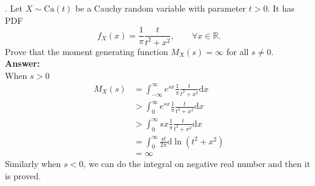 \documentclass[onecolumn, 12pt]{IEEEtran}
\newcommand{\dd}{\mathrm{d}}
\begin{document}
. Let $X\sim \mathrm{Ca}(t)$ be a Cauchy random variable with parameter $t > 0$. It has PDF
\begin{equation*}
f_X(x) =\frac 1\pi\frac{t}{t^2+x^2}, \qquad \forall x \in \mathbb{R}.
\end{equation*}
Prove that the moment generating function $M_X(s) = \infty$ for all $s \ne 0$.
\noindent 
\vspace*{0.1in}\\
\noindent 
{\bf Answer:}\\
When $s>0$
\begin{equation*}
\begin{aligned}
M_X(s)&=\int_{-\infty}^{\infty}e^{sx}\frac 1\pi\frac{t}{t^2+x^2}\dd x\\
&>\int_{0}^{\infty}e^{sx}\frac 1\pi\frac{t}{t^2+x^2}\dd x\\
&>\int_{0}^{\infty}sx\frac 1\pi\frac{t}{t^2+x^2}\dd x\\
&=\int_{0}^{\infty}\frac{st}{2\pi}\dd\ln(t^2+x^2)\\
&=\infty
\end{aligned}
\end{equation*}
Similarly when $s<0$, we can do the integral on negative real number and then  it is proved.
\noindent 
\vspace*{0.3in}
\end{document}

